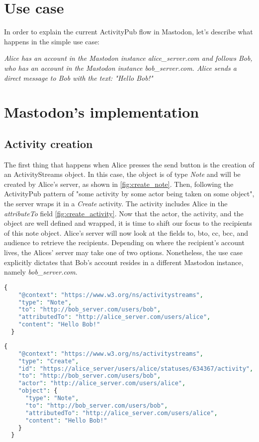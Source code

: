 \section{Use case}\label{section:use_case}
In order to explain the current ActivityPub flow in Mastodon, let's describe what happens in the simple use case:

\emph{Alice has an account in the Mastodon instance alice\_server.com and follows Bob, who has an account in the Mastodon instance bob\_server.com. Alice sends a direct message to Bob with the text: "Hello Bob!" }

\section{Mastodon's implementation}

\subsection{Activity creation}
The first thing that happens when Alice presses the send button is the creation of an ActivityStreams object. In this case, the object is of type \emph{Note} and will be created by Alice's server, as shown in \ref{fig:create_note}. Then, following the ActivityPub pattern of "some activity by some actor being taken on some object"\cite{lemmer-webber_tallon_guy_prodromou_2018}, the server wraps it in a \emph{Create} activity. The activity includes Alice in the \emph{attributeTo} field \ref{fig:create_activity}. Now that the actor, the activity, and the object are well defined and wrapped, it is time to shift our focus to the recipients of this note object. 
Alice's server will now look at the fields to, bto, cc, bcc, and audience to retrieve the recipients. Depending on where the recipient's account lives, the Alices' server may take one of two options. Nonetheless, the use case explicitly dictates that Bob's account resides in a different Mastodon instance, namely \emph{bob\_server.com}.

\lstset{style=JSONStyle}
\begin{lstlisting}[language=PHP, caption=ActivityStreams note object, label=fig:create_note]
  {
    "@context": "https://www.w3.org/ns/activitystreams",
    "type": "Note",
    "to": "http://bob_server.com/users/bob",
    "attributedTo": "http://alice_server.com/users/alice",
    "content": "Hello Bob!"
  }
\end{lstlisting}

\lstset{style=JSONStyle}
\begin{lstlisting}[language=PHP, caption=ActivityStreams create activity, label=fig:create_activity]
  {
    "@context": "https://www.w3.org/ns/activitystreams",
    "type": "Create",
    "id": "https://alice_server/users/alice/statuses/634367/activity",
    "to": "http://bob_server.com/users/bob",
    "actor": "http://alice_server.com/users/alice",
    "object": {
      "type": "Note",
      "to": "http://bob_server.com/users/bob",
      "attributedTo": "http://alice_server.com/users/alice",
      "content": "Hello Bob!"
    }
  }
\end{lstlisting}


